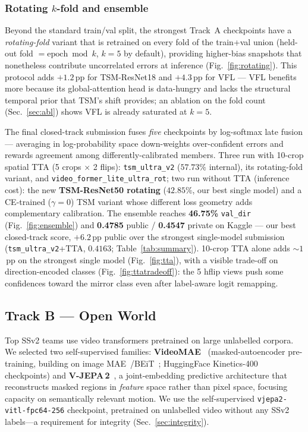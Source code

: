 \documentclass[10pt,twocolumn,letterpaper]{article}
\begin{document}
\subsubsection{Rotating $k$-fold and ensemble}
\label{sec:rotating}
Beyond the standard train/val split, the strongest Track~A checkpoints have a
\emph{rotating-fold} variant that is retrained on every fold of the train+val
union (held-out fold $= \text{epoch} \bmod k$, $k{=}5$ by default), providing
higher-bias snapshots that nonetheless contribute uncorrelated errors at
inference (Fig.~\ref{fig:rotating}). This protocol adds $+1.2$\,pp for
TSM-ResNet18 and $+4.3$\,pp for VFL --- VFL benefits more because its
global-attention head is data-hungry and lacks the structural temporal prior
that TSM's shift provides; an ablation on the fold count
(Sec.~\ref{sec:abl}) shows VFL is already saturated at $k{=}5$.

The final closed-track submission fuses \emph{five} checkpoints by
log-softmax late fusion --- averaging in log-probability space down-weights
over-confident errors and rewards agreement among differently-calibrated
members. Three run with 10-crop spatial TTA (5 crops $\times$ 2 flips):
\texttt{tsm\_ultra\_v2} ($57.73\%$ internal), its rotating-fold variant, and
\texttt{video\_former\_lite\_ultra\_rot}; two run without TTA (inference
cost): the new \textbf{TSM-ResNet50 rotating} ($42.85\%$, our best single
model) and a CE-trained ($\gamma{=}0$) TSM variant whose different loss
geometry adds complementary calibration. The ensemble reaches
\textbf{46.75\%} \texttt{val\_dir} (Fig.~\ref{fig:ensemble}) and
\textbf{0.4785} public / \textbf{0.4547} private on Kaggle --- our best
closed-track score, $+6.2$\,pp public over the strongest single-model
submission (\texttt{tsm\_ultra\_v2}+TTA, $0.4163$; Table~\ref{tab:summary}).
10-crop TTA alone adds ${\sim}1$\,pp on the strongest single model
(Fig.~\ref{fig:tta}), with a visible trade-off on direction-encoded classes
(Fig.~\ref{fig:ttatradeoff}): the 5 hflip views push some confidences toward
the mirror class even after label-aware logit remapping.

\subsection{Track B --- Open World}
\label{sec:trackB}
Top SSv2 teams use video transformers pretrained on large unlabelled corpora.
We selected two self-supervised families: \textbf{VideoMAE}~\cite{tong2022videomae}
(masked-autoencoder pre-training, building on image
MAE~\cite{he2022mae}/BEiT~\cite{bao2022beit}; HuggingFace Kinetics-400
checkpoints) and \textbf{V-JEPA\,2}~\cite{bardes2025vjepa2}, a joint-embedding
predictive architecture that reconstructs masked regions in \emph{feature} space
rather than pixel space, focusing capacity on semantically relevant motion. We
use the self-supervised \texttt{vjepa2-vitl-fpc64-256} checkpoint, pretrained on
unlabelled video without any SSv2 labels---a requirement for integrity
(Sec.~\ref{sec:integrity}).
\end{document}
